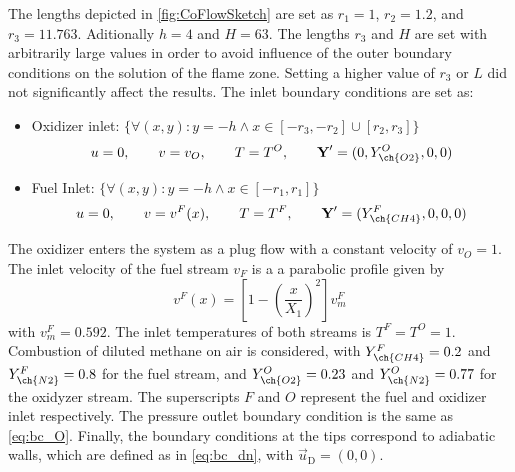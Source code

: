 The lengths depicted in \cref{fig:CoFlowSketch} are set as $ r_1 = 1$, $ r_2 = 1.2$, and $ r_3 = 11.763$. Aditionally $ h = 4$ and $ H = 63$. The lengths $ r_3$ and $H$ are set with arbitrarily large values in order to avoid influence of the outer boundary conditions on the solution of the flame zone. Setting a higher value of $ r_3$ or $ L$ did not significantly affect the results. The inlet boundary conditions are set as: 
\begin{itemize}
	\item Oxidizer inlet: $\{\forall (x,y): y = -h \land x \in [-r_3,-r_2]\cup[r_2,r_3]\}$\\
	\begin{equation*}
		u = 0,\qquad v= v_O, \qquad T = T^O, \qquad \vec{Y}' = (0,Y^O_{\ch{O2}},0,0)
	\end{equation*}
\item Fuel Inlet: $\{\forall (x,y): y = -h \land x \in [-r_1,r_1]\} $ \\
\begin{equation*}
	u = 0,\qquad v= v^F(x), \qquad T = T^F, \qquad \vec{Y}' = (Y^F_{\ch{CH4}},0,0,0)
\end{equation*}
\end{itemize}
The oxidizer enters the system as a plug flow with a constant velocity of $v_O = 1 $. The inlet velocity of the fuel stream $v_F$ is a a parabolic profile given by
\begin{equation}
	v^F(x) = \left[1-\left(\frac{x}{X_1}\right)^2\right]v_m^F
\end{equation}
with $v^F_m =0.592$.  The inlet temperatures of both streams is  $T^F = T^O = 1$. Combustion of diluted methane on air is considered, with $Y^F_{\ch{CH4}} = 0.2$ and $Y^F_{\ch{N2}} = 0.8$ for the fuel stream, and  $Y^O_{\ch{O2}} = 0.23$ and $Y^O_{\ch{N2}} = 0.77$ for the oxidyzer stream. The superscripts $F$ and $O$ represent the fuel and oxidizer inlet respectively. The pressure outlet boundary condition is the same as \cref{eq:bc_O}. Finally, the boundary conditions at the tips correspond to adiabatic walls, which are defined as in \cref{eq:bc_dn}, with $\vec{u}_{\text{D}} = (0,0)$.             

